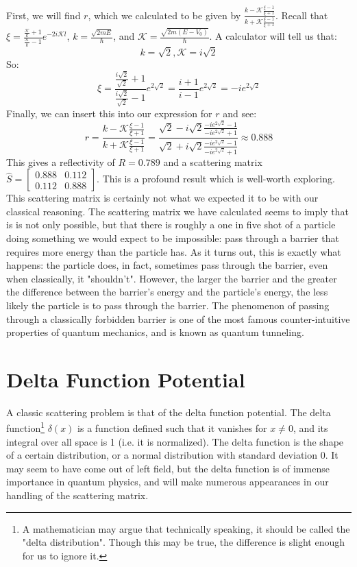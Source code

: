 \documentclass{report}
\begin{document}
First, we will find $r$, which we calculated to be given by $\frac{k - \mathcal{K}\frac{\xi - 1}{\xi + 1}}{k + \mathcal{K}\frac{\xi - 1}{\xi + 1}}$. Recall that $\xi = \frac{\frac{\mathcal{K}}{k} + 1}{\frac{\mathcal{K}}{k} - 1}e^{-2i\mathcal{K}l}$, $k = \frac{\sqrt{2mE}}{\hbar}$, and $\mathcal{K} = \frac{\sqrt{2m(E-V_0)}}{\hbar}$. A calculator will tell us that:
\[
k = \sqrt{2}, \mathcal{K} = i\sqrt{2}
\]
So:
\[
\xi = \frac{\frac{i \sqrt{2}}{\sqrt{2}} + 1}{\frac{i \sqrt{2}}{\sqrt{2}} - 1}e^{2\sqrt{2}} = \frac{i+1}{i-1}e^{2\sqrt{2}} = -i e^{2\sqrt{2}}
\]
Finally, we can insert this into our expression for $r$ and see:
\[
r = \frac{k - \mathcal{K}\frac{\xi - 1}{\xi + 1}}{k + \mathcal{K}\frac{\xi - 1}{\xi + 1}} = \frac{\sqrt{2} - i\sqrt{2}\frac{-i e^{2\sqrt{2}} - 1}{-i e^{2\sqrt{2}} + 1}}{\sqrt{2} + i\sqrt{2}\frac{-i e^{2\sqrt{2}} - 1}{-i e^{2\sqrt{2}} + 1}} \approx 0.888
\]
This gives a reflectivity of $R = 0.789$ and a scattering matrix $\hat{S} = \begin{bmatrix} 0.888 & 0.112 \\ 0.112 & 0.888 \end{bmatrix}$. This is a profound result which is well-worth exploring. This scattering matrix is certainly not what we expected it to be with our classical reasoning. The scattering matrix we have calculated seems to imply that is is not only possible, but that there is roughly a one in five shot of a particle doing something we would expect to be impossible: pass through a barrier that requires more energy than the particle has. As it turns out, this is exactly what happens: the particle does, in fact, sometimes pass through the barrier, even when classically, it "shouldn't". However, the larger the barrier and the greater the difference between the barrier's energy and the particle's energy, the less likely the particle is to pass through the barrier. The phenomenon of passing through a classically forbidden barrier is one of the most famous counter-intuitive properties of quantum mechanics, and is known as quantum tunneling.

\section{Delta Function Potential}
A classic scattering problem is that of the delta function potential. The delta function\footnote{A mathematician may argue that technically speaking, it should be called the "delta distribution". Though this may be true, the difference is slight enough for us to ignore it.} $\delta(x)$ is a function defined such that it vanishes for $x \neq 0$, and its integral over all space is 1 (i.e. it is normalized). The delta function is the shape of a certain distribution, or a normal distribution with standard deviation 0. It may seem to have come out of left field, but the delta function is of immense importance in quantum physics, and will make numerous appearances in our handling of the scattering matrix.
\end{document}

